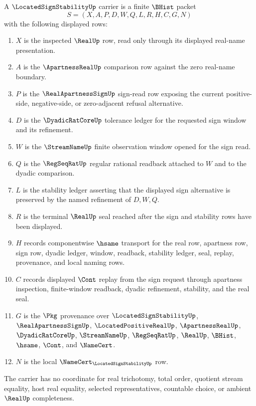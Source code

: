 \begin{definition}
\label{def:located-sign-stability-carrier}
A $\LocatedSignStabilityUp$ carrier is a finite $\BHist$ packet
$$
S=(X,A,P,D,W,Q,L,R,H,C,G,N)
$$
with the following displayed rows:
\begin{enumerate}
\item $X$ is the inspected $\RealUp$ row, read only through its displayed real-name presentation.
\item $A$ is the $\ApartnessRealUp$ comparison row against the zero real-name boundary.
\item $P$ is the $\RealApartnessSignUp$ sign-read row exposing the current positive-side, negative-side, or zero-adjacent refusal alternative.
\item $D$ is the $\DyadicRatCoreUp$ tolerance ledger for the requested sign window and its refinement.
\item $W$ is the $\StreamNameUp$ finite observation window opened for the sign read.
\item $Q$ is the $\RegSeqRatUp$ regular rational readback attached to $W$ and to the dyadic comparison.
\item $L$ is the stability ledger asserting that the displayed sign alternative is preserved by the named refinement of $D,W,Q$.
\item $R$ is the terminal $\RealUp$ seal reached after the sign and stability rows have been displayed.
\item $H$ records componentwise $\hsame$ transport for the real row, apartness row, sign row, dyadic ledger, window, readback, stability ledger, seal, replay, provenance, and local naming rows.
\item $C$ records displayed $\Cont$ replay from the sign request through apartness inspection, finite-window readback, dyadic refinement, stability, and the real seal.
\item $G$ is the $\Pkg$ provenance over $\LocatedSignStabilityUp$, $\RealApartnessSignUp$, $\LocatedPositiveRealUp$, $\ApartnessRealUp$, $\DyadicRatCoreUp$, $\StreamNameUp$, $\RegSeqRatUp$, $\RealUp$, $\BHist$, $\hsame$, $\Cont$, and $\NameCert$.
\item $N$ is the local $\NameCert_{\LocatedSignStabilityUp}$ row.
\end{enumerate}
The carrier has no coordinate for real trichotomy, total order, quotient stream equality, host real equality, selected representatives, countable choice, or ambient $\RealUp$ completeness.
\end{definition}

